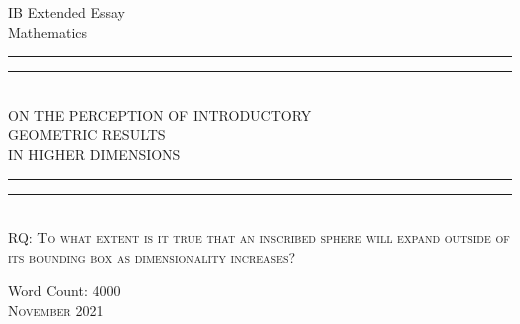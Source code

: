 \begin{titlepage}

    \centering
    \vfill
    
    \large{IB Extended Essay}\\
    \large{Mathematics}\\
    
    \rule{\textwidth}{1.6pt}\vspace*{-\baselineskip}\vspace*{3.2pt}
    \rule{\textwidth}{0.4pt}\\[0.2\baselineskip]
    
    {\LARGE ON THE PERCEPTION OF INTRODUCTORY\\[0.3\baselineskip] GEOMETRIC RESULTS\\[0.5\baselineskip] IN HIGHER DIMENSIONS}\\[0.2\baselineskip]
    
    
    
    \rule{\textwidth}{0.4pt}\vspace*{-\baselineskip}\vspace*{3.2pt}
    \rule{\textwidth}{1.6pt}\\[\baselineskip]
    \scshape
    RQ: To what extent is it true that an inscribed sphere will expand outside of its bounding box as dimensionality increases?
    \par
    \vfill
    
    \small{Word Count: 4000} \\
    \vspace*{2\baselineskip}
    {\scshape November 2021} \\
  \end{titlepage}